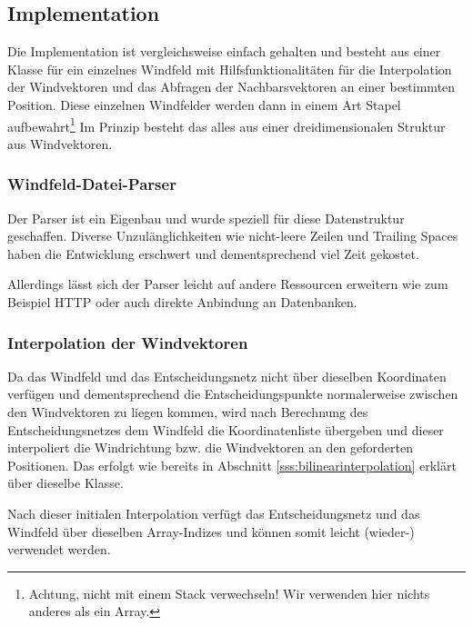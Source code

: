 \subsection{Implementation}
Die Implementation ist vergleichsweise einfach gehalten und besteht aus
einer Klasse für ein einzelnes Windfeld mit Hilfsfunktionalitäten für
die Interpolation der Windvektoren und das Abfragen der Nachbarsvektoren
an einer bestimmten Position. Diese einzelnen Windfelder werden dann in
einem Art Stapel aufbewahrt\footnote{Achtung, nicht mit einem Stack
verwechseln! Wir verwenden hier nichts anderes als ein Array.} Im
Prinzip besteht das alles aus einer dreidimensionalen Struktur aus
Windvektoren.

\subsubsection{Windfeld-Datei-Parser}
Der Parser ist ein Eigenbau und wurde speziell für diese Datenstruktur
geschaffen. Diverse Unzulänglichkeiten wie nicht-leere Zeilen und
Trailing Spaces haben die Entwicklung erschwert und dementsprechend viel
Zeit gekostet.

Allerdings lässt sich der Parser leicht auf andere Ressourcen erweitern
wie zum Beispiel HTTP oder auch direkte Anbindung an Datenbanken.

\subsubsection{Interpolation der Windvektoren}
Da das Windfeld und das Entscheidungsnetz nicht über dieselben
Koordinaten verfügen und dementsprechend die Entscheidungspunkte
normalerweise zwischen den Windvektoren zu liegen kommen, wird nach
Berechnung des Entscheidungsnetzes dem Windfeld die Koordinatenliste
übergeben und dieser interpoliert die Windrichtung bzw. die Windvektoren
an den geforderten Positionen. Das erfolgt wie bereits in Abschnitt
\ref{sss:bilinearinterpolation} erklärt über dieselbe Klasse.

Nach dieser initialen Interpolation verfügt das Entscheidungsnetz und
das Windfeld über dieselben Array-Indizes und können somit leicht
(wieder-) verwendet werden.
